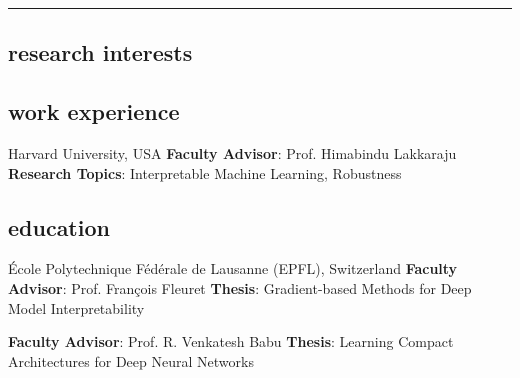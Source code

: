 \documentclass[11pt, a4paper, english]{moderncv}        %
\newcommand{\cvsection}[1]{\vspace{0.3cm}\subsection{\Large{{#1}}}}
\begin{document}
\pagecolor{floralwhite}

\makecvtitle

\vspace{-1.7cm}
\textcolor{gray}{\hrule}


\cvsection{research interests}


\cvsection{work experience}
{\newline Harvard University, USA}
{\newline \textbf{Faculty Advisor}: Prof. Himabindu Lakkaraju 
\newline \textbf{Research Topics}: Interpretable Machine Learning, Robustness}{}

\cvsection{education}
{ \newline \'{E}cole Polytechnique F\'{e}d\'{e}rale de Lausanne (EPFL), Switzerland}
{ \newline \textbf{Faculty Advisor}: Prof. Fran\c{c}ois Fleuret
  \newline \textbf{Thesis}: Gradient-based Methods for Deep Model Interpretability}
{}
\vspace*{0.5em}

{ \newline \textbf{Faculty Advisor}: Prof. R. Venkatesh Babu
\newline \textbf{Thesis}: Learning Compact Architectures for Deep Neural Networks}{} 
\end{document}
